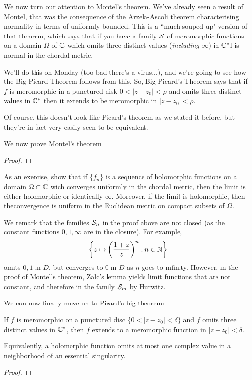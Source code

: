 \documentclass{article}
\begin{document}
We now turn our attention to Montel's theorem. We've already seen a result of Montel, that was the consequence of the Arzela-Ascoli theorem characterising normality in terms of uniformly bounded. This is a ``much souped up" version of that theorem, which says that if you have a family \(\mathcal{S}\) of meromorphic functions on a domain \(\Omega\) of \(\mathbb{C}\) which omits three distinct values (\textit{including} \(\infty\)) in \(\mathbb{C}^*\)l is normal in the chordal metric.

We'll do this on Monday (too bad there's a virus...), and we're going to see how the Big Picard Theorem follows from this. So, Big Picard's Theorem says that if \(f\) is meromorphic in a punctured disk \(0 < |z - z_0| < \rho\) and omits three distinct values in \(\mathbb{C}^*\) then it extends to be meromorphic in \(|z - z_0| < \rho\).

Of course, this doesn't look like Picard's theorem as we stated it before, but they're in fact very easily seen to be equivalent.

We now prove Montel's theorem
\begin{proof}
\end{proof}

As an exercise, show that if \(\{f_n\}\) is a sequence of holomorphic functions on a domain \(\Omega \subset \mathbb{C}\) wich converges uniformly in the chordal metric, then the limit is either holomorphic or identically \(\infty\). Moreover, if the limit is holomorphic, then theconvergence is uniform in the Euclidean metric on compact subsets of \(\Omega\).

We remark that the families \(\mathcal{S}_n\) in the proof above are not closed (as the constant functions \(0, 1, \infty\) are in the closure). For example,
\begin{equation}\left\{z \mapsto \left(\frac{1 + z}{z}\right)^n : n \in \mathbb{N}\right\}\end{equation}
omits \(0, 1\) in \(D\), but converges to \(0\) in \(D\) as \(n\) goes to infinity. However, in the proof of Montel's theorem, Zalc's lemma yields limit functions that are not constant, and therefore in the family \(\mathcal{S}_m\) by Hurwitz.

We can now finally move on to Picard's big theorem:
\begin{theorem}
If \(f\) is meromorphic on a punctured disc \(\{0 < |z - z_0| < \delta\}\) and \(f\) omits three distinct values in \(\mathbb{C}^*\), then \(f\) extends to a meromorphic function in \(|z - z_0| < \delta\).

Equivalently, a holomorphic function omits at most one complex value in a neighborhood of an essential singularity.
\end{theorem}
\begin{proof}
\end{proof}
\end{document}
